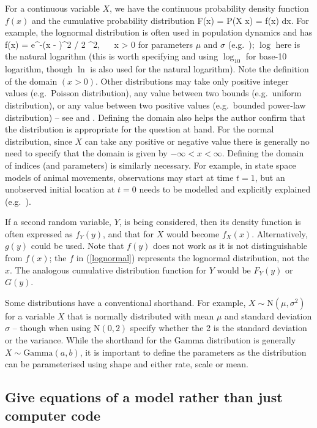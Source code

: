 For a continuous variable $X$, we have the continuous probability density
function $f(x)$ and the cumulative probability distribution
\eb
F(x) = \mbox{P}(X \leq x) = \int f(x) \mbox{d}x.
\ee
For example, the lognormal distribution is often used in population dynamics
and has
\eb
f(x) =  \mbox{e}^{-(\log x - \mu)^2 / 2
  \sigma^2}, ~~ x > 0
\label{lognormal}
\ee
for parameters $\mu$ and $\sigma$ (e.g.~\citealt{bolk08}); $\log$ here is
the natural logarithm (this is worth specifying and using $\log_{10}$ for
base-10 logarithm, though $\ln$ is also used for the natural logarithm).
Note the definition
of the domain $(x > 0)$.
Other distributions may take only positive integer values
(e.g.~Poisson distribution),
any value between two bounds (e.g.~uniform distribution), or any value
between two positive values (e.g.~bounded power-law distribution) --
see \citet{bolk08} and \citet{erpbb17}. Defining the domain also helps the
author confirm that the distribution is appropriate for the
question at hand. For the normal distribution, since $X$
can take any positive or negative value there is generally no need to
specify that the domain is given by $-\infty < x < \infty$.
Defining the domain of indices (and parameters) is similarly necessary. For
example, in state space models of animal movements, observations may start
at time $t=1$, but an unobserved initial location at $t=0$ needs to be modelled
and explicitly explained (e.g.~\citealt{augerm16}).

If a second random
variable, $Y$, is being considered, then its density function
is often expressed as $f_Y(y)$, and that for $X$ would become $f_X(x)$.
Alternatively, $g(y)$ could be used. Note that $f(y)$ does not work as it
is not distinguishable from $f(x)$; the $f$ in (\ref{lognormal})
represents the lognormal distribution, not the $x$.
The analogous cumulative distribution function for $Y$ would
be $F_Y(y)$ or $G(y)$.

Some distributions have a conventional shorthand. For example, $X \sim
\mbox{N}(\mu, \sigma^2)$ for a variable $X$ that is normally distributed with
mean $\mu$ and standard deviation $\sigma$ -- though when using N$(0,2)$
specify whether the 2 is the standard deviation or the variance.
While the shorthand for the Gamma
distribution is generally $X \sim \mbox{Gamma}(a, b)$, it is important to define
the parameters as the distribution can be parameterised using shape and either
rate, scale or mean.

\subsection*{Give equations of a model rather than just computer code}


